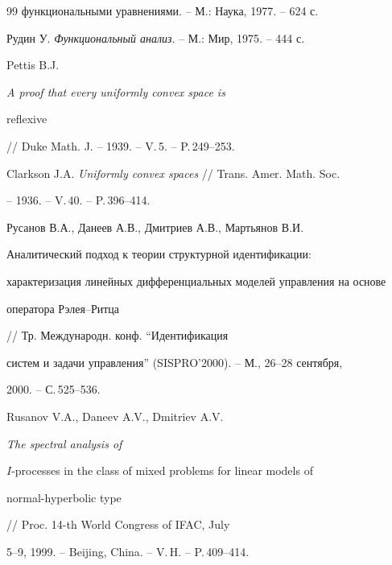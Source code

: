 \begin{thebibliography}{99}
{функциональными уравнениями}. -- М.: Наука, 1977. -- 624 с. 




Рудин У. {\em Функциональный анализ}. -- М.: Мир, 1975. -- 444 с. 




Pettis B.J. {\em A proof that every uniformly convex space is 


reflexive} // Duke Math. J. -- 1939. -- V.\,5. -- P.\,249--253. 




Clarkson J.A. {\em Uniformly convex spaces} // Trans. Amer. Math. Soc. 


-- 1936. -- V.\,40. -- P.\,396--414. 




Русанов В.А., Данеев А.В., Дмитриев А.В., Мартьянов В.И. {\em 


Аналитический подход к теории структурной идентификации$:$ 


характеризация линейных дифференциальных моделей управления на основе 


оператора Рэлея--Ритца} // Тр. Международн. конф. ``Идентификация 


систем и задачи управления'' (SISPRO'2000). -- М., 26--28 сентября, 


2000. -- С.\,525--536. 




Rusanov V.A., Daneev A.V., Dmitriev A.V. {\em The spectral analysis of 


$I$-processes in the class of mixed problems for linear models of 


normal-hyperbolic type} // Proc. 14-th World Congress of IFAC, July 


5--9, 1999. -- Beijing, China. -- V.\,H. -- P.\,409--414. 


 


 


\end{thebibliography} 


 


\vskip 2cm 


 










\smallskip 


 






 


\label{end} 


 


